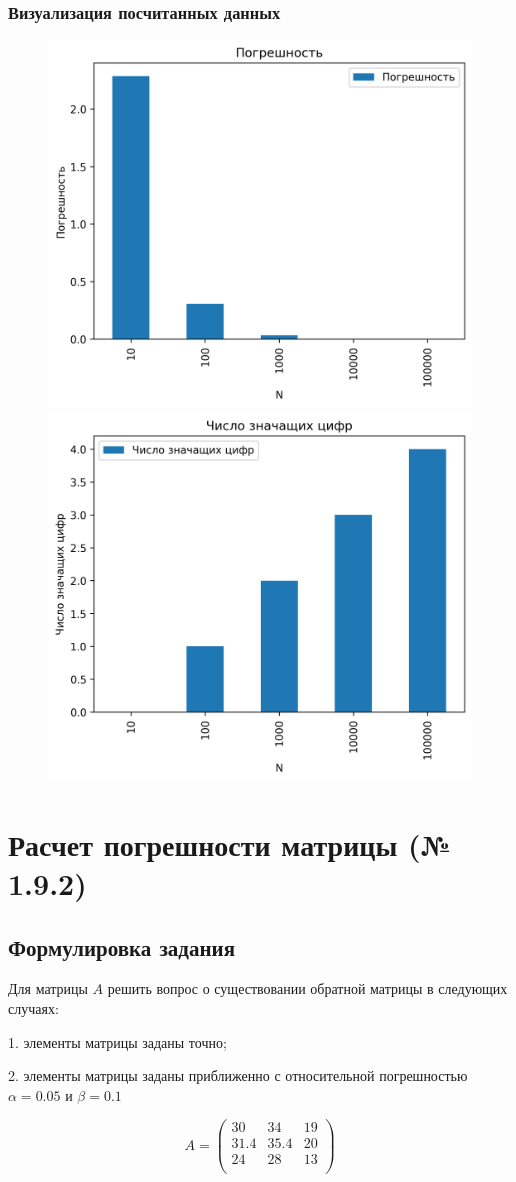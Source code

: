 \documentclass[a4paper,11pt]{article}
\theoremstyle{definition} %
\theoremstyle{remark} %
\begin{document}


\subsubsection{Визуализация посчитанных данных}

\begin{figure}[h]
    \includegraphics[width=0.49\linewidth]{../../calculate_sum/errors}
    \includegraphics[width=0.49\linewidth]{../../calculate_sum/digits}
\end{figure}

\newpage
\section{Расчет погрешности матрицы (№ 1.9.2)}

\subsection{Формулировка задания}

Для матрицы $A$ решить вопрос о существовании обратной матрицы в следующих случаях:

1. элементы матрицы заданы точно;

2. элементы матрицы заданы приближенно с относительной погрешностью $\alpha = 0.05$ и $\beta = 0.1$

$$
A =
\begin{pmatrix}
    30 & 34 & 19 \\
    31.4 & 35.4 & 20 \\
    24 & 28 & 13 \\
\end{pmatrix}
$$
\end{document}
